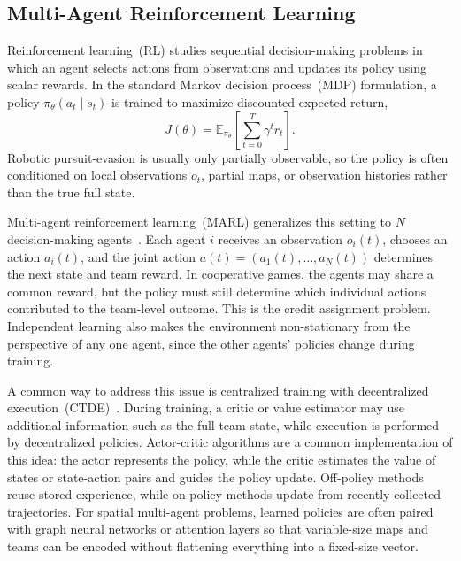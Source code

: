 \documentclass[conference]{IEEEtran}
\begin{document}
\subsection{Multi-Agent Reinforcement Learning}\label{sec:MARL}

Reinforcement learning~(RL) studies sequential decision-making problems in which an agent selects actions from observations and updates its policy using scalar rewards.
In the standard Markov decision process~(MDP) formulation, a policy $\pi_\theta(a_t\mid s_t)$ is trained to maximize discounted expected return,
\[
J(\theta)=\mathbb{E}_{\pi_\theta}\left[\sum_{t=0}^{T}\gamma^t r_t\right].
\]
Robotic pursuit-evasion is usually only partially observable, so the policy is often conditioned on local observations $o_t$, partial maps, or observation histories rather than the true full state.

Multi-agent reinforcement learning~(MARL) generalizes this setting to $N$ decision-making agents~\cite{busoniu2008comprehensive}.
Each agent $i$ receives an observation $o_i(t)$, chooses an action $a_i(t)$, and the joint action $a(t)=(a_1(t),\ldots,a_N(t))$ determines the next state and team reward.
In cooperative games, the agents may share a common reward, but the policy must still determine which individual actions contributed to the team-level outcome.
This is the credit assignment problem.
Independent learning also makes the environment non-stationary from the perspective of any one agent, since the other agents' policies change during training.

A common way to address this issue is centralized training with decentralized execution~(CTDE)~\cite{lowe2017multiagent}.
During training, a critic or value estimator may use additional information such as the full team state, while execution is performed by decentralized policies.
Actor-critic algorithms are a common implementation of this idea: the actor represents the policy, while the critic estimates the value of states or state-action pairs and guides the policy update.
Off-policy methods reuse stored experience, while on-policy methods update from recently collected trajectories.
For spatial multi-agent problems, learned policies are often paired with graph neural networks or attention layers so that variable-size maps and teams can be encoded without flattening everything into a fixed-size vector.
\end{document}
